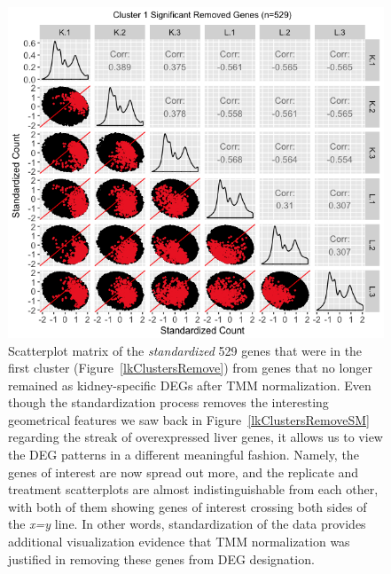 \documentclass{article}
\begin{document}
  \null
  \begin{figure}[t!]
  \centerline{\includegraphics[width=1\columnwidth]{../MakeFigures/lkClustersRemoveSM-St.jpg}}
  \caption{Scatterplot matrix of the \textit{standardized} 529 genes that were in the first cluster (Figure~\ref{lkClustersRemove}) from genes that no longer remained as kidney-specific DEGs after TMM normalization. Even though the standardization process removes the interesting geometrical features we saw back in Figure~\ref{lkClustersRemoveSM} regarding the streak of overexpressed liver genes, it allows us to view the DEG patterns in a different meaningful fashion. Namely, the genes of interest are now spread out more, and the replicate and treatment scatterplots are almost indistinguishable from each other, with both of them showing genes of interest crossing both sides of the \textit{x=y} line. In other words, standardization of the data provides additional visualization evidence that TMM normalization was justified in removing these genes from DEG designation. 
  \label{lkClustersRemoveSM-St}}
  \end{figure}
  
\end{document}
